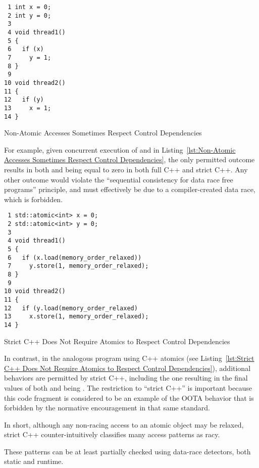 \documentclass[10]{article}
\begin{document}
\begin{listing}[tbp]
\begin{verbatim}
 1 int x = 0;
 2 int y = 0;
 3
 4 void thread1()
 5 {
 6   if (x)
 7     y = 1;
 8 }
 9
10 void thread2()
11 {
12   if (y)
13     x = 1;
14 }
\end{verbatim}
\caption{Non-Atomic Accesses Sometimes Respect Control Dependencies}
\label{lst:Non-Atomic Accesses Sometimes Respect Control Dependencies}
\end{listing}

For example, given concurrent execution of  and
 in
Listing~\ref{lst:Non-Atomic Accesses Sometimes Respect Control Dependencies},
the only permitted outcome results in both  and  being
equal to zero in both full C++ and strict C++.
Any other outcome would violate the ``sequential consistency for
data race free programs'' principle, and must effectively be due to a
compiler-created data race, which is forbidden.

\begin{listing}[tbp]
\begin{verbatim}
 1 std::atomic<int> x = 0;
 2 std::atomic<int> y = 0;
 3
 4 void thread1()
 5 {
 6   if (x.load(memory_order_relaxed))
 7     y.store(1, memory_order_relaxed);
 8 }
 9
10 void thread2()
11 {
12   if (y.load(memory_order_relaxed)
13     x.store(1, memory_order_relaxed);
14 }
\end{verbatim}
\caption{Strict C++ Does Not Require Atomics to Respect Control Dependencies}
\label{lst:Strict C++ Does Not Require Atomics to Respect Control Dependencies}
\end{listing}

In contrast, in the analogous program using C++ atomics
(see Listing~\ref{lst:Strict C++ Does Not Require Atomics to Respect Control Dependencies}),
additional behaviors are permitted by strict C++,
including the one resulting in the final values of both 
and  being .
The restriction to ``strict C++'' is important because this code fragment
is considered to be an example of the OOTA behavior that is forbidden
by the normative encouragement in that same standard.

In short, although any non-racing access to an atomic object may be
relaxed, strict C++ counter-intuitively classifies many access patterns
as racy.

These patterns can be at least partially checked using data-race
detectors, both static and runtime.
\end{document}
